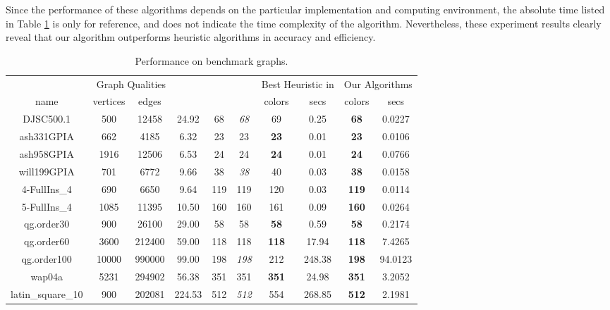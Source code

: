 \documentclass[11pt]{article}
\begin{document}
Since the performance of these algorithms depends on the particular implementation and computing environment, the absolute time listed in Table \ref{tab:benchmark_graphs} is only for reference, and does not indicate the time complexity of the algorithm. Nevertheless, these experiment results clearly reveal that our algorithm outperforms heuristic algorithms in accuracy and efficiency.


	\begin{table}[thbp]
		\centering
		\footnotesize
		\begin{tabular}{|c||c|c|c|c|c||c|c|c|c|}
			\hline
			\multicolumn{6}{|c||}{Graph Qualities} & \multicolumn{2}{c|}{Best Heuristic in \cite{hilgemeier2003fast}} & \multicolumn{2}{c|}{Our Algorithms} \\
			name & vertices & edges &  &  &  & colors & secs & colors & secs \\
			\hline\hline
			DJSC500.1 & 500 & 12458 & 24.92 & 68 & \emph{68} & 69 & 0.25 & \textbf{68} & 0.0227 \\
			ash331GPIA & 662 & 4185 & 6.32 & 23 & 23  & \textbf{23} & 0.01 & \textbf{23} & 0.0106 \\
			ash958GPIA & 1916 & 12506 & 6.53 & 24 & 24 & \textbf{24} & 0.01 & \textbf{24} & 0.0766 \\
			will199GPIA & 701 & 6772 & 9.66 & 38 & \emph{38} & 40 & 0.03 & \textbf{38} & 0.0158 \\
			4-FullIns\_4 & 690 & 6650 & 9.64 & 119 & 119 & 120 & 0.03 & \textbf{119} & 0.0114 \\
			5-FullIns\_4 & 1085 & 11395 & 10.50 & 160 & 160 & 161 & 0.09 & \textbf{160} & 0.0264 \\
			qg.order30 & 900 & 26100 & 29.00 & 58 & 58 & \textbf{58} & 0.59 & \textbf{58} & 0.2174 \\
			qg.order60 & 3600 & 212400 & 59.00 & 118 & 118 & \textbf{118} & 17.94 & \textbf{118} & 7.4265 \\
			qg.order100 & 10000 & 990000 & 99.00 & 198 & \emph{198} & 212 & 248.38 & \textbf{198} & 94.0123 \\
			wap04a & 5231 & 294902 & 56.38 & 351 & 351 & \textbf{351} & 24.98 & \textbf{351} & 3.2052 \\
			latin\_square\_10 & 900 & 202081 & 224.53 & 512 & \emph{512} & 554 & 268.85 & \textbf{512} & 2.1981 \\
			\hline
		\end{tabular}
		\caption{Performance on benchmark graphs.}
		\label{tab:benchmark_graphs}
	\end{table}
\end{document}
